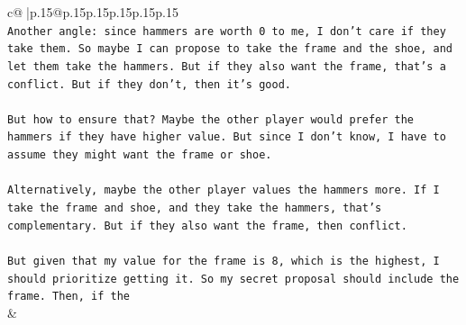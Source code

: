 \documentclass{article}
\begin{document}
{\begin{supertabular}{c@{$\;$}|p{.15\linewidth}@{}p{.15\linewidth}p{.15\linewidth}p{.15\linewidth}p{.15\linewidth}p{.15\linewidth}}
{{{\\ 
\texttt{Another angle: since hammers are worth 0 to me, I don't care if they take them. So maybe I can propose to take the frame and the shoe, and let them take the hammers. But if they also want the frame, that's a conflict. But if they don't, then it's good.} \\
\\ 
\texttt{But how to ensure that? Maybe the other player would prefer the hammers if they have higher value. But since I don't know, I have to assume they might want the frame or shoe.} \\
\\ 
\texttt{Alternatively, maybe the other player values the hammers more. If I take the frame and shoe, and they take the hammers, that's complementary. But if they also want the frame, then conflict.} \\
\\ 
\texttt{But given that my value for the frame is 8, which is the highest, I should prioritize getting it. So my secret proposal should include the frame. Then, if the} \\
            }
        }
    }
    & \\ \\


\end{supertabular}}
\end{document}
